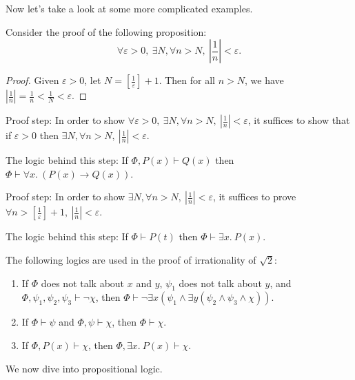 Now let's take a look at some more complicated examples. 

\begin{example}
    Consider the proof of the following proposition: 
    \[\forall\varepsilon>0,\ \exists N, \forall n>N,\ \left|\frac{1}{n}\right|<\varepsilon.\]

    \begin{proof}
        Given $\varepsilon>0$, let $N=\left[ \frac{1}{\varepsilon} \right]+1$. Then for all $n>N$, we have $\left|\frac{1}{n}\right|=\frac{1}{n}<\frac{1}{N}<\varepsilon$. 
    \end{proof}

    Proof step: In order to show $\forall\varepsilon>0,\ \exists N, \forall n>N,\ \left|\frac{1}{n}\right|<\varepsilon$, it suffices to show that if $\varepsilon>0$ then $\exists N, \forall n>N,\ \left|\frac{1}{n}\right|<\varepsilon$.

    The logic behind this step: If $\Phi, P(x)\vdash Q(x)$ then $\Phi\vdash \forall x.\ (P(x)\rightarrow Q(x))$. 
    
    \mbox{}

    Proof step: In order to show $\exists N, \forall n>N,\ \left|\frac{1}{n}\right|<\varepsilon$, it suffices to prove $\forall n>\left[ \frac{1}{\varepsilon} \right]+1,\ \left|\frac{1}{n}\right|<\varepsilon$.

    The logic behind this step: If $\Phi\vdash P(t)$ then $\Phi\vdash \exists x.\ P(x)$.
\end{example}

\begin{example}
    The following logics are used in the proof of irrationality of $\sqrt{2}$:
    \begin{enumerate}[itemindent=0ex, itemsep=0pt, label=\upshape{(\alph*)}]
        \item If $\Phi$ does not talk about $x$ and $y$, $\psi_1$ does not talk about $y$, and $\Phi, \psi_1, \psi_2, \psi_3\vdash\neg\chi$, then $\Phi\vdash \neg\exists x(\psi_1\wedge\exists y(\psi_2\wedge\psi_3\wedge\chi))$.
        \item If $\Phi\vdash\psi$ and $\Phi,\psi\vdash\chi$, then $\Phi\vdash\chi$.
        \item If $\Phi,P(x)\vdash\chi$, then $\Phi,\exists x.\ P(x)\vdash\chi$.
    \end{enumerate}
\end{example}

We now dive into propositional logic. 


